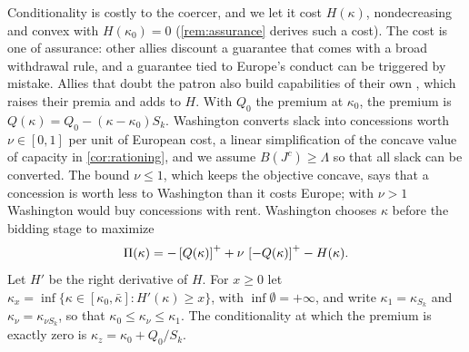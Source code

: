 Conditionality is costly to the coercer, and we let it cost $H(\kappa)$, nondecreasing and convex with $H(\kappa_0)=0$ (\cref{rem:assurance} derives such a cost). The cost is one of assurance: other allies discount a guarantee that comes with a broad withdrawal rule, and a guarantee tied to Europe's conduct can be triggered by mistake. Allies that doubt the patron also build capabilities of their own \citep{lanoszka2018atomic}, which raises their premia and adds to $H$. With $Q_0$ the premium at $\kappa_0$, the premium is $Q(\kappa)=Q_0-(\kappa-\kappa_0)S_k$. Washington converts slack into concessions worth $\nu\in[0,1]$ per unit of European cost, a linear simplification of the concave value of capacity in \cref{cor:rationing}, and we assume $B(J^c)\ge\Lambda$ so that all slack can be converted. The bound $\nu\le 1$, which keeps the objective concave, says that a concession is worth less to Washington than it costs Europe; with $\nu>1$ Washington would buy concessions with rent. Washington chooses $\kappa$ before the bidding stage to maximize
\[
\Pi(\kappa)=-\left[Q(\kappa)\right]^{+}+\nu\,\left[-Q(\kappa)\right]^{+}-H(\kappa).
\]
Let $H'$ be the right derivative of $H$. For $x\ge 0$ let $\kappa_x=\inf\{\kappa\in[\kappa_0,\bar\kappa]:H'(\kappa)\ge x\}$, with $\inf\emptyset=+\infty$, and write $\kappa_1=\kappa_{S_k}$ and $\kappa_\nu=\kappa_{\nu S_k}$, so that $\kappa_0\le\kappa_\nu\le\kappa_1$. The conditionality at which the premium is exactly zero is $\kappa_z=\kappa_0+Q_0/S_k$.

